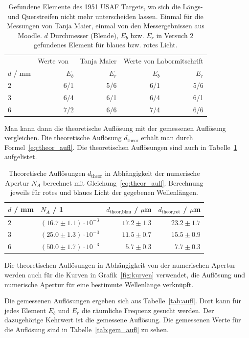 \documentclass{article}
\begin{document}
\begin{table}[H]
\caption{Gefundene Elemente des 1951 USAF Targets, wo sich die Längs- und Querstreifen nicht mehr unterscheiden lassen. Einmal für die Messungen von Tanja Maier, einmal von den Messergebnissen aus Moodle. $d$ Durchmesser (Blende), $E_b$ bzw. $E_r$ in Versuch 2 gefundenes Element für blaues bzw. rotes Licht.}

\begin{tabular}{l|rr|rr}
& \multicolumn{2}{p{2.5cm}|}{Werte von  ~~ Tanja Maier} & \multicolumn{2}{p{2.5cm}}{Werte von Labor\-mitschrift} \\
$d$ / mm  & $E_b$ & $E_r$ & $E_b$ & $E_r$   \\
\hline
2 &  6/1 & 5/6 & 6/1 & 5/6 \\
3 &  6/4 & 6/1 & 6/4 & 6/1 \\
6 &  7/2 & 6/6 & 7/4 & 6/6
\end{tabular}
\end{table}


Man kann dann die theoretische Auflösung mit der gemessenen Auflösung vergleichen. Die theoretische Auflösung $d_{\text{theor}}$ erhält man durch Formel~\eqref{eq:theor_aufl}. Die theoretischen Auflösungen sind auch in Tabelle~\ref{tab:theor_aufl} aufgelistet.


\begin{table}[H]
\caption{Theoretische Auflösungen $d_\text{theor}$ in Abhängigkeit der numerische Apertur $N_A$ berechnet mit Gleichung~\eqref{eq:theor_aufl}. Berechnung jeweils für rotes und blaues Licht der gegebenen Wellenlängen.}
\label{tab:theor_aufl}
\begin{tabular}{l|l|rr}
$d$ / mm  & $N_A$ / 1 & $d_\text{theor,blau}$ / $\mu$m & $d_\text{theor,rot}$ / $\mu$m\\
\hline
2 & $(16.7 \pm 1.1)\cdot 10^{-3}$ & $17.2 \pm 1.3$ & $23.2 \pm 1.7$ \\
3 & $(25.0 \pm 1.3)\cdot 10^{-3}$ & $11.5 \pm 0.7$ & $15.5 \pm 0.9$ \\
6 & $(50.0 \pm 1.7)\cdot 10^{-3}$ & $5.7 \pm 0.3$ & $7.7 \pm 0.3$ 
\end{tabular}
\end{table}

Die theoretischen Auflösungen in Abhängigkeit von der numerischen Apertur werden auch für die Kurven in Grafik~\ref{fig:kurven} verwendet, die Auflösung und numerische Apertur für eine bestimmte Wellenlänge verknüpft.

Die gemessenen Auflösungen ergeben sich aus Tabelle~\ref{tab:aufl}. Dort kann für jedes Element $E_b$ und $E_r$ die räumliche Frequenz gesucht werden. Der dazugehörige Kehrwert ist die gemessene Auflösung. Die gemessenen Werte für die Auflösung sind in Tabelle~\ref{tab:gem_aufl} zu sehen.
\end{document}
